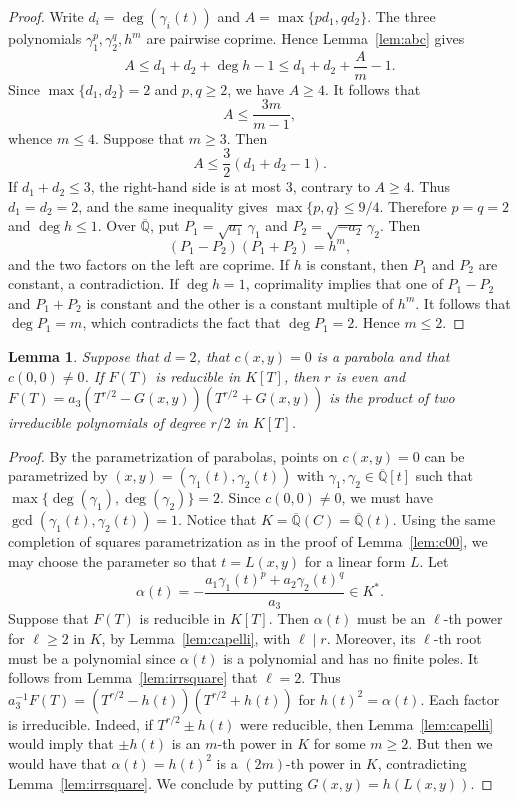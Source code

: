 \documentclass[a4paper,11pt,twoside,reqno]{amsart}
\newtheorem{lemma}[theorem]{Lemma}
\theoremstyle{definition}
\theoremstyle{remark}
\numberwithin{equation}{section}
\newcommand\QQ{\mathbb{Q}}
\newcommand\K{\overline{\mathbb{Q}}}
\newcommand\1{\mathbf{1}}
\renewcommand{\leq}{\leqslant}
\renewcommand{\geq}{\geqslant}
\begin{document}
\begin{proof} 
Write $d_i=\deg(\gamma_i(t))$ and $A=\max\{pd_1,qd_2\}$. 
The three polynomials $\gamma_1^p,\gamma_2^q,h^m$ are pairwise coprime. Hence 
Lemma~\ref{lem:abc}
gives \[ A \leq d_1+d_2+\deg h-1 \leq d_1+d_2+\frac Am-1. \] Since $\max\{d_1,d_2\}=2$ and $p,q\geq2$, we have $A\geq4$. It follows that \[ A\leq\frac{3m}{m-1}, \] 
whence $m\leq4$. Suppose that $m\geq3$. 
Then 
\[ A\leq\frac32(d_1+d_2-1). 
\] 
If $d_1+d_2\leq3$, the right-hand side is at most $3$, contrary to $A\geq4$. Thus $d_1=d_2=2$, and the same inequality gives $\max\{p,q\}\leq9/4$. Therefore $p=q=2$
and $\deg h\leq1$. 
Over $\overline{\QQ}$, put $P_1=\sqrt{a_1}\,\gamma_1$ and $P_2=\sqrt{-a_2}\,\gamma_2$. 
Then \[ (P_1-P_2)(P_1+P_2)=h^m, \] and the two factors on the left are coprime. If $h$ is constant, then $P_1$ and $P_2$ are constant, a contradiction. If $\deg h=1$, coprimality implies that one of $P_1-P_2$ and $P_1+P_2$ is constant and the other is a constant multiple of $h^m$. It follows that $\deg P_1=m$, which contradicts the fact that $\deg P_1=2$. Hence $m\leq2$. \end{proof}

\begin{lemma}\label{lem:conicirr}
Suppose that $d=2$, that $c(x,y)=0$ is a parabola and that $c(0,0)\neq 0$. 
If 
$F(T)$ is reducible in $K[T]$, then $r$ is even and $F(T)=a_3(T^{r/2}-G(x,y))(T^{r/2}+G(x,y))$ is the product of two irreducible polynomials of degree $r/2$ in $K[T]$.
\end{lemma}
\begin{proof}
 By the parametrization of parabolas, points on $c(x,y)=0$ can be parametrized by $(x,y)=(\gamma_1(t),\gamma_2(t))$ with $\gamma_1,\gamma_2\in \K[t]$ such that 
 $\max\{\deg(\gamma_1),\deg(\gamma_2)\}=2$. Since $c(0,0)\neq 0$, we must have $\gcd(\gamma_1(t),\gamma_2(t))=1$. Notice that $K=\K(C)=\K(t)$. 
 Using the same completion of squares parametrization as in 
the proof of Lemma~\ref{lem:c00}, we may choose the parameter so that $t=L(x,y)$ for a linear form $L$.
Let 
	\[\alpha(t)=-\frac{a_1\gamma_1(t)^p+a_2\gamma_2(t)^q}{a_3}\in K^*.
	\]
Suppose that $F(T)$ is reducible in $K[T]$. Then $\alpha(t)$ must be an $\ell$-th power for $\ell\geq 2$ in $K$, by Lemma~\ref{lem:capelli}, with $\ell\mid r$.
Moreover, its $\ell$-th root must be a polynomial since $\alpha(t)$ is a polynomial and has no finite poles. It follows from Lemma~\ref{lem:irrsquare} that $\ell=2$.
Thus $a_3^{-1}F(T)=(T^{r/2}-h(t))(T^{r/2}+h(t))$ for $h(t)^2=\alpha(t)$. 
	Each factor is irreducible. Indeed, if $T^{r/2}\pm h(t)$ were reducible, 
	then Lemma~\ref{lem:capelli} would imply that $\pm h(t)$ is an $m$-th power in $K$ for some $m\geq2$. But then we would have that $\alpha(t)=h(t)^2$ is a $(2m)$-th power in $K$, contradicting Lemma~\ref{lem:irrsquare}.
We conclude by putting $G(x,y)=h(L(x,y))$.
\end{proof}
\end{document}
